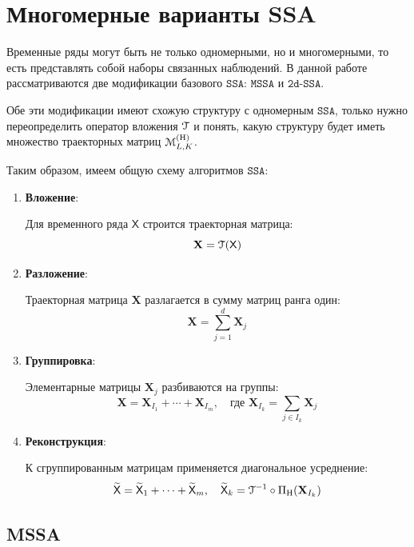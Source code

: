 \documentclass[12pt, specialist, subf
]{disser}
\theoremstyle{definition}
\newcommand{\SSA}{\texttt{SSA}}
\newcommand{\MSSA}{\texttt{MSSA}}
\newcommand{\DSSA}{\texttt{2d-SSA}}
\newcommand{\TS}{\mathsf{X}}
\newcommand{\MH}{\EuScript{M}_{L,K}^{(\mathrm{H})}}
\newcommand{\EMB}{\EuScript{T}}
\newcommand{\PH}{\Pi_{\mathrm{H}}}
\begin{document}
\section{Многомерные варианты SSA}

Временные ряды могут быть не только одномерными, но и многомерными, то есть представлять собой наборы связанных наблюдений.  В данной работе рассматриваются две модификации базового $\SSA$:
$\MSSA$ и $\DSSA$.

Обе эти модификации имеют схожую структуру с одномерным $\SSA$, только нужно переопределить оператор вложения $\EMB$ и понять, какую структуру будет иметь множество траекторных матриц $\MH$.

Таким образом, имеем общую схему алгоритмов $\SSA$:

\begin{enumerate}
	\item \textbf{Вложение}:

	      Для временного ряда $\TS$ строится траекторная матрица:
	      \[
		      \mathbf{X} = \EMB(\TS)
	      \]

	\item \textbf{Разложение}:

	      Траекторная матрица $\mathbf{X}$ разлагается в сумму матриц ранга один:
	      \[
		      \mathbf{X} = \sum_{j=1}^d \mathbf{X}_j
	      \]

	\item \textbf{Группировка}:

	      Элементарные матрицы $\mathbf{X}_j$ разбиваются на группы:
	      \[
		      \mathbf{X} = \mathbf{X}_{I_1} + \cdots + \mathbf{X}_{I_m}, \quad \text{где } \mathbf{X}_{I_k} = \sum_{j \in I_k} \mathbf{X}_j
	      \]

	\item \textbf{Реконструкция}:

	      К сгруппированным матрицам применяется диагональное усреднение:
	      \[
		      \widetilde{\TS} = \widetilde{\TS}_1 + \cdots + \widetilde{\TS}_m, \quad
		      \widetilde{\TS}_k =\EMB^{-1} \circ \PH (\mathbf{X}_{I_k})
	      \]
\end{enumerate}


\subsection{MSSA}
\label{sec:mssa}


\end{document}
